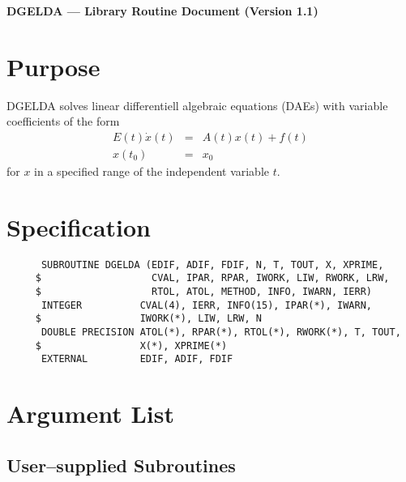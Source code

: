 


\begin{center}
  {\bf DGELDA --- Library Routine Document (Version 1.1)}
\end{center} 
 
\section{Purpose}

DGELDA \cite{KunMRW95} solves linear differentiell algebraic equations
(DAEs) with variable coefficients of the form 
$$
  \begin{array}{rcl}
    E(t)\dot{x}(t) &=& A(t)x(t) + f(t)\\
    x(t_0) &=& x_0
  \end{array}
$$
for $x$ in a specified range of the independent variable $t$.

\section{Specification}

\begin{verbatim}
      SUBROUTINE DGELDA (EDIF, ADIF, FDIF, N, T, TOUT, X, XPRIME,
     $                   CVAL, IPAR, RPAR, IWORK, LIW, RWORK, LRW,
     $                   RTOL, ATOL, METHOD, INFO, IWARN, IERR)
      INTEGER          CVAL(4), IERR, INFO(15), IPAR(*), IWARN,
     $                 IWORK(*), LIW, LRW, N
      DOUBLE PRECISION ATOL(*), RPAR(*), RTOL(*), RWORK(*), T, TOUT,
     $                 X(*), XPRIME(*)
      EXTERNAL         EDIF, ADIF, FDIF
\end{verbatim}

\section{Argument List}

\subsection{User--supplied Subroutines}

